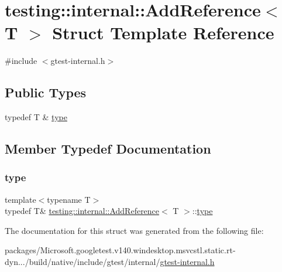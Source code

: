 \hypertarget{structtesting_1_1internal_1_1_add_reference}{}\section{testing\+::internal\+::Add\+Reference$<$ T $>$ Struct Template Reference}
\label{structtesting_1_1internal_1_1_add_reference}


{\ttfamily \#include $<$gtest-\/internal.\+h$>$}

\subsection*{Public Types}
\begin{DoxyCompactItemize}
\item 
typedef T \& \mbox{\hyperlink{structtesting_1_1internal_1_1_add_reference_a2df8dd7c4e41f6390e6e66b1a9a67bb4}{type}}
\end{DoxyCompactItemize}


\subsection{Member Typedef Documentation}
\mbox{\label{structtesting_1_1internal_1_1_add_reference_a2df8dd7c4e41f6390e6e66b1a9a67bb4}} 
\subsubsection{\texorpdfstring{type}{type}}
{\footnotesize\ttfamily template$<$typename T$>$ \\
typedef T\& \mbox{\hyperlink{structtesting_1_1internal_1_1_add_reference}{testing\+::internal\+::\+Add\+Reference}}$<$ T $>$\+::\mbox{\hyperlink{structtesting_1_1internal_1_1_add_reference_a2df8dd7c4e41f6390e6e66b1a9a67bb4}{type}}}



The documentation for this struct was generated from the following file\+:\begin{DoxyCompactItemize}
\item 
packages/\+Microsoft.\+googletest.\+v140.\+windesktop.\+msvcstl.\+static.\+rt-\/dyn.../build/native/include/gtest/internal/\mbox{\hyperlink{gtest-internal_8h}{gtest-\/internal.\+h}}\end{DoxyCompactItemize}
